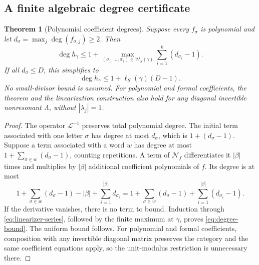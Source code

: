 \documentclass[11pt,letterpaper]{article}
\newtheorem{theorem}{Theorem}[section]
\theoremstyle{definition}
\theoremstyle{remark}
\newcommand{\Li}{\mathcal L}
\newcommand{\NN}{\mathcal N}
\newcommand{\word}{\mathcal W}
\numberwithin{equation}{section}
\begin{document}
\subsection{A finite algebraic degree certificate}
\begin{theorem}[Polynomial coefficient degrees]\label{thm:degrees}
Suppose every $f_\sigma$ is polynomial and let
$d_\sigma=\max_j\deg(f_{\sigma,j})\ge2$. Then
\begin{equation}\label{eq:degree-bound}
 \deg h_\gamma\le
 1+\max_{(\sigma_1,\ldots,\sigma_k)\in\word_S(\gamma)}
       \sum_{i=1}^k(d_{\sigma_i}-1).
\end{equation}
If all $d_\sigma\le D$, this simplifies to
\begin{equation}\label{eq:uniform-degree}
 \deg h_\gamma\le1+\ell_S(\gamma)(D-1).
\end{equation}
No small-divisor bound is assumed. For polynomial and formal coefficients,
the theorem and the linearization construction also hold for any diagonal
invertible nonresonant $\Lambda$, without $|\lambda_j|=1$.
\end{theorem}
\begin{proof}
The operator $\Li^{-1}$ preserves total polynomial degree. The initial
term associated with one letter $\sigma$ has degree at most $d_\sigma$,
which is $1+(d_\sigma-1)$. Suppose a term associated with a word $w$ has
degree at most $1+\sum_{\sigma\in w}(d_\sigma-1)$, counting repetitions.
A term of $\NN_f$ differentiates it $|\beta|$ times and multiplies by
$|\beta|$ additional coefficient polynomials of $f$. Its degree is at most
\[
 1+\sum_{\sigma\in w}(d_\sigma-1)-|\beta|
        +\sum_{i=1}^{|\beta|}d_{\sigma_i}
 =1+\sum_{\sigma\in w}(d_\sigma-1)
        +\sum_{i=1}^{|\beta|}(d_{\sigma_i}-1).
\]
If the derivative vanishes, there is no term to bound. Induction through
\eqref{eq:linearizer-series}, followed by the finite maximum at $\gamma$,
proves \eqref{eq:degree-bound}. The uniform bound follows. For polynomial
and formal coefficients, composition with any invertible diagonal matrix
preserves the category and the same coefficient equations apply, so the
unit-modulus restriction is unnecessary there.
\end{proof}
\end{document}

